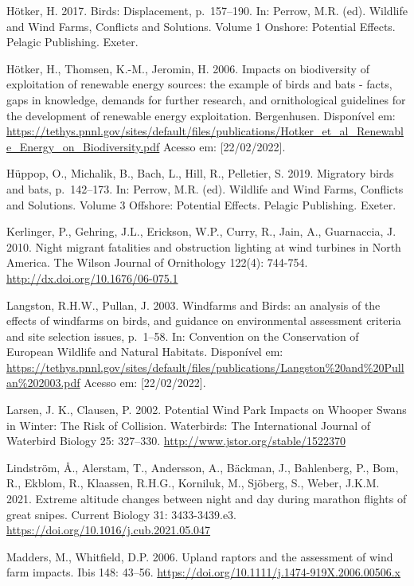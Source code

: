 \documentclass[
  oneside]{scrbook}
\begin{document}
Hötker, H. 2017. Birds: Displacement, p.~157--190. In: Perrow, M.R. (ed). Wildlife and Wind Farms, Conflicts and Solutions. Volume 1 Onshore: Potential Effects. Pelagic Publishing. Exeter.

Hötker, H., Thomsen, K.-M., Jeromin, H. 2006. Impacts on biodiversity of exploitation of renewable energy sources: the example of birds and bats - facts, gaps in knowledge, demands for further research, and ornithological guidelines for the development of renewable energy exploitation. Bergenhusen. Disponível em: \url{https://tethys.pnnl.gov/sites/default/files/publications/Hotker_et_al_Renewable_Energy_on_Biodiversity.pdf} Acesso em: {[}22/02/2022{]}.

Hüppop, O., Michalik, B., Bach, L., Hill, R., Pelletier, S. 2019. Migratory birds and bats, p.~142--173. In: Perrow, M.R. (ed). Wildlife and Wind Farms, Conflicts and Solutions. Volume 3 Offshore: Potential Effects. Pelagic Publishing. Exeter.

Kerlinger, P., Gehring, J.L., Erickson, W.P., Curry, R., Jain, A., Guarnaccia, J. 2010. Night migrant fatalities and obstruction lighting at wind turbines in North America. The Wilson Journal of Ornithology 122(4): 744-754. \url{http://dx.doi.org/10.1676/06-075.1}

Langston, R.H.W., Pullan, J. 2003. Windfarms and Birds: an analysis of the effects of windfarms on birds, and guidance on environmental assessment criteria and site selection issues, p.~1--58. In: Convention on the Conservation of European Wildlife and Natural Habitats. Disponível em: \url{https://tethys.pnnl.gov/sites/default/files/publications/Langston\%20and\%20Pullan\%202003.pdf} Acesso em: {[}22/02/2022{]}.

Larsen, J. K., Clausen, P. 2002. Potential Wind Park Impacts on Whooper Swans in Winter: The Risk of Collision. Waterbirds: The International Journal of Waterbird Biology 25: 327--330. \url{http://www.jstor.org/stable/1522370}

Lindström, Å., Alerstam, T., Andersson, A., Bäckman, J., Bahlenberg, P., Bom, R., Ekblom, R., Klaassen, R.H.G., Korniluk, M., Sjöberg, S., Weber, J.K.M. 2021. Extreme altitude changes between night and day during marathon flights of great snipes. Current Biology 31: 3433-3439.e3. \url{https://doi.org/10.1016/j.cub.2021.05.047}

Madders, M., Whitfield, D.P. 2006. Upland raptors and the assessment of wind farm impacts. Ibis 148: 43--56. \url{https://doi.org/10.1111/j.1474-919X.2006.00506.x}
\end{document}
